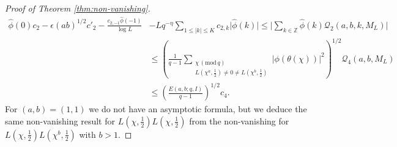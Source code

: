 \documentclass[12pt]{amsart}
\theoremstyle{plain}
\theoremstyle{definition}
\theoremstyle{remark}
\numberwithin{equation}{section}
\newcommand{\ZZ}{\mathbb{Z}}
\newcommand{\mods}[1]{\,(\mathrm{mod}\,{#1})}
\renewcommand{\leq}{\leqslant}
\begin{document}
\begin{proof}[Proof of Theorem \ref{thm:non-vanishing}]
    
    \begin{align*}
        \widehat{\phi}(0)c_2-\epsilon (ab)^{1/2}c'_2-\frac{c_{2,-1}\widehat{\phi}(-1)}{\log L} &- Lq^{-\eta}\sum_{1\leq \vert{k}\vert \leq K}c_{2,k}\vert{\widehat{\phi}(k)}\vert  \leq \vert{\sum_{k\in \ZZ}\widehat{\phi}(k)\mathcal{Q}_2(a,b,k,M_L)}\vert \\& \leq \left(\frac{1}{q-1}\sum_{\substack{\chi\mods{q}\\L(\chi^a,\tfrac{1}{2})\neq 0\neq L(\chi^b,\tfrac{1}{2})}}\vert{\phi(\theta(\chi))}\vert^2\right)^{1/2}\mathcal{Q}_4(a,b,M_L) \\ &\leq \left(\frac{E(a,b;q,I)}{q-1}\right)^{1/2} c_4.
    \end{align*}
For $(a,b)=(1,1)$ we do not have an asymptotic formula, but we deduce the same non-vanishing result for $L(\chi,\tfrac 12)L(\chi,\tfrac 12)$ from the non-vanishing for $L(\chi,\tfrac 12)L(\chi^b,\tfrac 12)$ with $ b>1$. 
   \end{proof}




\printbibliography 
\nocite{Blomeretal}
\end{document}
